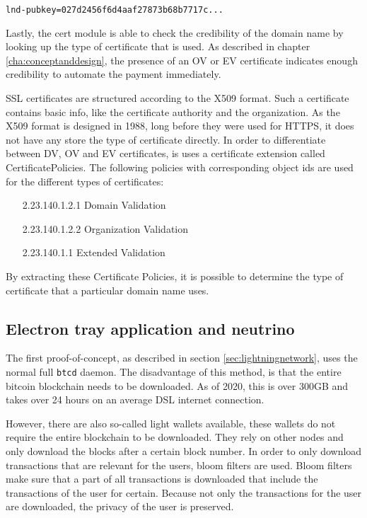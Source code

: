 \texttt{lnd-pubkey=027d2456f6d4aaf27873b68b7717c...}

Lastly, the cert module is able to check the credibility of the domain name by looking up the type of certificate that is used. As described in chapter \ref{cha:conceptanddesign}, the presence of an OV or EV certificate indicates enough credibility to automate the payment immediately. 

SSL certificates are structured according to the X509 format. Such a certificate contains basic info, like the certificate authority and the organization. As the X509 format is designed in 1988, long before they were used for HTTPS, it does not have any store the type of certificate directly. In order to differentiate between DV, OV and EV certificates, is uses a certificate extension called CertificatePolicies. The following policies with corresponding object ids are used for the different types of certificates:

\begin{enumerate}[leftmargin=8em]
  \item[2.23.140.1.2.1] Domain Validation
  \item[2.23.140.1.2.2] Organization Validation
  \item[2.23.140.1.1] Extended Validation
\end{enumerate}

By extracting these Certificate Policies, it is possible to determine the type of certificate that a particular domain name uses. 

\subsection{Electron tray application and neutrino}
The first proof-of-concept, as described in section \ref{sec:lightningnetwork}, uses the normal full \texttt{btcd} daemon. The disadvantage of this method, is that the entire bitcoin blockchain needs to be downloaded. As of 2020, this is over 300GB and takes over 24 hours on an average DSL internet connection. 

However, there are also so-called light wallets available, these wallets do not require the entire blockchain to be downloaded. They rely on other nodes and only download the blocks after a certain block number. In order to only download transactions that are relevant for the users, bloom filters are used. Bloom filters make sure that a part of all transactions is downloaded that include the transactions of the user for certain. Because not only the transactions for the user are downloaded, the privacy of the user is preserved. 

